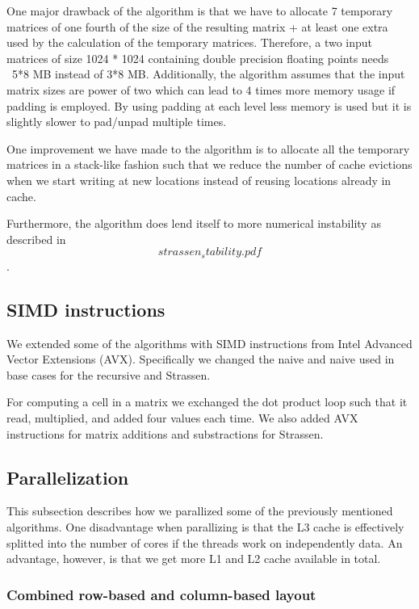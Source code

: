 One major drawback of the algorithm is that we have to allocate 7 temporary matrices of one fourth of the size of the resulting matrix + at least one extra used by the calculation of the temporary matrices. Therefore, a two input matrices of size 1024 * 1024 containing double precision floating points needs ~5*8 MB instead of 3*8 MB. Additionally, the algorithm assumes that the input matrix sizes are power of two which can lead to 4 times more memory usage if padding is employed. By using padding at each level less memory is used but it is slightly slower to pad/unpad multiple times.

One improvement we have made to the algorithm is to allocate all the temporary matrices in a stack-like fashion such that we reduce the number of cache evictions when we start writing at new locations instead of reusing locations already in cache.

Furthermore, the algorithm does lend itself to more numerical instability as described in \[strassen_stability.pdf\].

\subsection{SIMD instructions}

We extended some of the algorithms with SIMD instructions from Intel Advanced Vector Extensions (AVX). Specifically we changed the naive and naive used in base cases for the recursive and Strassen.

For computing a cell in a matrix we exchanged the dot product loop such that it read, multiplied, and added four values each time. We also added AVX instructions for matrix additions and substractions for Strassen.

\subsection{Parallelization}

This subsection describes how we parallized some of the previously mentioned algorithms. One disadvantage when parallizing is that the L3 cache is effectively splitted into the number of cores if the threads work on independently data. An advantage, however, is that we get more L1 and L2 cache available in total.


\subsubsection{Combined row-based and column-based layout}

